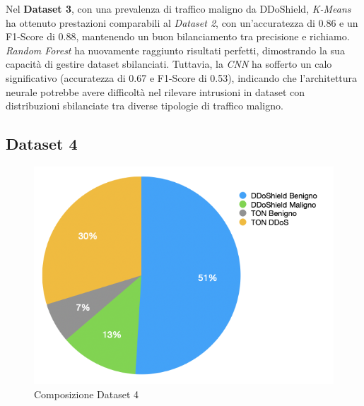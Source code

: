 \begin{table}[htbp]
\centering
\renewcommand{\arraystretch}{1.5} %
\caption{Metriche di performance per Dataset 3}
\label{tab:performance_metrics}
\end{table}

Nel \textbf{Dataset 3}, con una prevalenza di traffico maligno da DDoShield, \textit{K-Means} ha ottenuto prestazioni comparabili al \textit{Dataset 2}, con un'accuratezza di 0.86 e un F1-Score di 0.88, mantenendo un buon bilanciamento tra precisione e richiamo.
\textit{Random Forest} ha nuovamente raggiunto risultati perfetti, dimostrando la sua capacità di gestire dataset sbilanciati. Tuttavia, la \textit{CNN} ha sofferto un calo significativo (accuratezza di 0.67 e F1-Score di 0.53), indicando che l'architettura neurale potrebbe avere difficoltà nel rilevare intrusioni in dataset con distribuzioni sbilanciate tra diverse tipologie di traffico maligno.

\subsection{Dataset 4}

\begin{figure}[htbp]
\centering
\includegraphics[scale= 0.8]{UNINA_MSc_Thesis_Project/img/chapterRisulati/composizione_DATASET_4.png}
  \caption{Composizione Dataset 4}
\end{figure}

